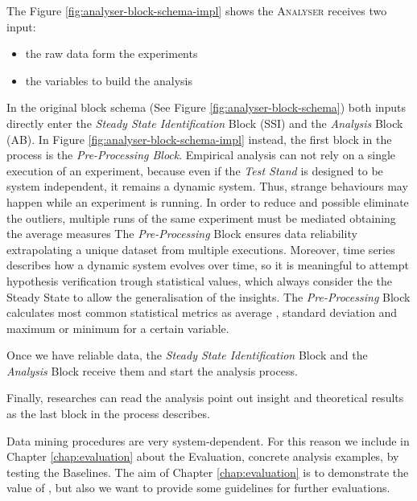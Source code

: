 The Figure \ref{fig:analyser-block-schema-impl} shows the \textsc{Analyser} receives two input:
\begin{itemize}
\item the raw data form the experiments
\item the variables to build the analysis
\end{itemize}


In the original block schema (See Figure \ref{fig:analyser-block-schema}) both inputs directly enter the \textit{Steady State Identification} Block (SSI) and the \textit{Analysis} Block (AB). In Figure \ref{fig:analyser-block-schema-impl}   instead, the first block in the process is the \textit{Pre-Processing Block}. Empirical analysis can not rely on a single execution of an experiment, because even if the \textit{Test Stand} is designed to be system independent, it remains a dynamic system. Thus, strange behaviours may happen while an experiment is running. In order to reduce and possible eliminate the outliers, multiple runs of the same experiment must be mediated obtaining the average measures The \textit{Pre-Processing} Block ensures data reliability extrapolating a unique dataset from multiple executions. Moreover, time series describes how a dynamic system evolves over time, so it is meaningful to attempt hypothesis verification trough statistical values, which always consider the the Steady State to allow the generalisation of the insights. The \textit{Pre-Processing} Block calculates most common statistical metrics as average , standard deviation and maximum or minimum for a certain variable.


Once we have reliable data, the \textit{Steady State Identification} Block and the \textit{Analysis} Block receive them and start the analysis process. 

Finally, researches can read the analysis point out insight and theoretical results as the last block in the process describes.

Data mining procedures are very system-dependent. For this reason we include in Chapter \ref{chap:evaluation} about the \name Evaluation, concrete analysis examples, by testing the Baselines. The aim of Chapter \ref{chap:evaluation} is to demonstrate the value of \namens, but also we want to provide some guidelines for further evaluations.

